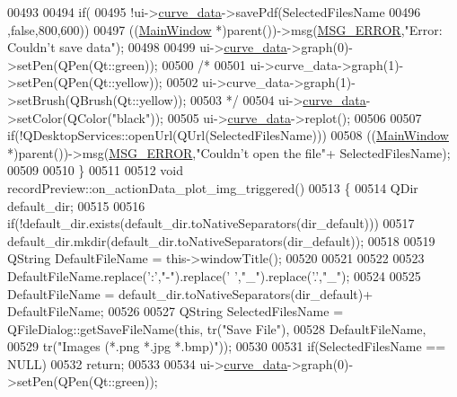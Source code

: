 \begin{DoxyCode}
00493 
00494       \textcolor{keywordflow}{if}(
00495         !ui->\hyperlink{a00081_a247d94481323c0bc4f8b6458a8a535dd}{curve\_data}->savePdf(SelectedFilesName
00496                                 ,\textcolor{keyword}{false},800,600))
00497             ((\hyperlink{a00017}{MainWindow} *)parent())->msg(\hyperlink{a00090_aa8a990825a5a62c89d2fb8b08d8a1070}{MSG\_ERROR},\textcolor{stringliteral}{"Error: Couldn't save data"});
00498 
00499        ui->\hyperlink{a00081_a247d94481323c0bc4f8b6458a8a535dd}{curve\_data}->graph(0)->setPen(QPen(Qt::green));
00500       \textcolor{comment}{/*}
00501 \textcolor{comment}{       ui->curve\_data->graph(1)->setPen(QPen(Qt::yellow));}
00502 \textcolor{comment}{       ui->curve\_data->graph(1)->setBrush(QBrush(Qt::yellow));}
00503 \textcolor{comment}{       */}
00504        ui->\hyperlink{a00081_a247d94481323c0bc4f8b6458a8a535dd}{curve\_data}->setColor(QColor(\textcolor{stringliteral}{"black"}));
00505        ui->\hyperlink{a00081_a247d94481323c0bc4f8b6458a8a535dd}{curve\_data}->replot();
00506 
00507        \textcolor{keywordflow}{if}(!QDesktopServices::openUrl(QUrl(SelectedFilesName)))
00508            ((\hyperlink{a00017}{MainWindow} *)parent())->msg(\hyperlink{a00090_aa8a990825a5a62c89d2fb8b08d8a1070}{MSG\_ERROR},\textcolor{stringliteral}{"Couldn't open the file"}+
      SelectedFilesName);
00509 
00510 \}
00511 
00512 \textcolor{keywordtype}{void} recordPreview::on\_actionData\_plot\_img\_triggered()
00513 \{
00514     QDir default\_dir;
00515 
00516     \textcolor{keywordflow}{if}(!default\_dir.exists(default\_dir.toNativeSeparators(dir\_default)))
00517         default\_dir.mkdir(default\_dir.toNativeSeparators(dir\_default));
00518 
00519     QString DefaultFileName = this->windowTitle();
00520 
00521 
00522 
00523     DefaultFileName.replace(\textcolor{charliteral}{':'},\textcolor{stringliteral}{"-"}).replace(\textcolor{charliteral}{' '},\textcolor{stringliteral}{"\_"}).replace(\textcolor{charliteral}{'.'},\textcolor{stringliteral}{"\_"});
00524 
00525     DefaultFileName = default\_dir.toNativeSeparators(dir\_default)+ DefaultFileName;
00526 
00527     QString SelectedFilesName = QFileDialog::getSaveFileName(\textcolor{keyword}{this}, tr(\textcolor{stringliteral}{"Save File"}),
00528                                                         DefaultFileName,
00529                                                          tr(\textcolor{stringliteral}{"Images (*.png *.jpg *.bmp)"}));
00530 
00531     \textcolor{keywordflow}{if}(SelectedFilesName == NULL)
00532         \textcolor{keywordflow}{return};
00533 
00534     ui->\hyperlink{a00081_a247d94481323c0bc4f8b6458a8a535dd}{curve\_data}->graph(0)->setPen(QPen(Qt::green));

\end{DoxyCode}
